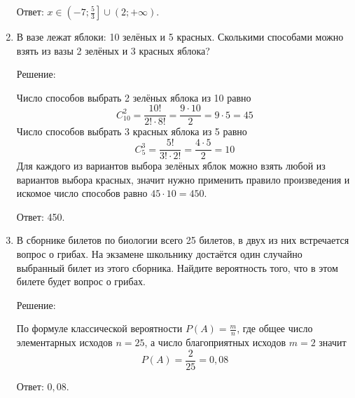 \documentclass{article}
\begin{document}
\begin{enumerate}
Ответ: $x\in\left(-7;\frac{5}{3}\right]\cup\left(2;+\infty\right)$.

\item %
В вазе лежат яблоки: 10 зелёных и 5 красных. Сколькими способами можно взять из вазы 2 зелёных и 3 красных яблока?

Решение:

Число способов выбрать 2 зелёных яблока из 10 равно $$C_{10}^2=\frac{10!}{2!\cdot8!}=\frac{9\cdot10}{2}=9\cdot5=45$$
Число способов выбрать 3 красных яблока из 5 равно
$$C_{5}^3=\frac{5!}{3!\cdot2!}=\frac{4\cdot5}{2}=10$$
Для каждого из вариантов выбора зелёных яблок можно взять любой из вариантов выбора красных, значит нужно применить правило произведения и искомое число способов равно $45\cdot10=450$.

Ответ: 450.

\item %
В сборнике билетов по биологии всего 25 билетов, в двух из них встречается вопрос о грибах. На экзамене школьнику достаётся один случайно выбранный билет из этого сборника. Найдите вероятность того, что в этом билете будет вопрос о грибах.

Решение:

По формуле классической вероятности $P(A)=\frac{m}{n}$, где общее число элементарных исходов $n=25$, а число благоприятных исходов $m=2$ значит $$P(A)=\frac{2}{25}=0,08$$

Ответ: $0,08$.

\end{enumerate}
\end{document}
